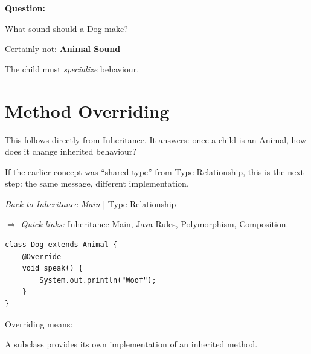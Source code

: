 \documentclass[11pt,a4paper]{book}
\begin{document}

\textbf{Question:}

What sound should a Dog make?


Certainly not: \textbf{Animal Sound}


The child must \emph{\textcolor{RosettaGold}{specialize}} behaviour.


\section{Method Overriding}\label{sec:method_overriding}

This follows directly from \hyperref[chap:inheritance]{Inheritance}. It answers: once a child is an Animal, how does it change inherited behaviour?

If the earlier concept was ``shared type'' from \hyperref[sec:inheritance_type_relationship]{Type Relationship}, this is the next step: the same message, different implementation.

\smallskip
\noindent
\hyperref[chap:inheritance]{\emph{Back to Inheritance Main}} |
\hyperref[sec:inheritance_type_relationship]{Type Relationship}

\smallskip
\noindent
\textcolor{RosettaRoyalPurple}{$\Rightarrow$}
\emph{Quick links: }
\hyperref[chap:inheritance]{Inheritance Main},
\hyperref[sec:inheritance_addendum]{Java Rules},
\hyperref[chap:polymorphism]{Polymorphism},
\hyperref[chap:composition]{Composition}.

\smallskip

\begin{verbatim}
class Dog extends Animal {
    @Override
    void speak() {
        System.out.println("Woof");
    }
}
\end{verbatim}


\begin{idea}

\textcolor{RosettaDeepGreen}{Overriding} means:

A subclass provides its own implementation
of an inherited method.

\end{idea}
\end{document}
